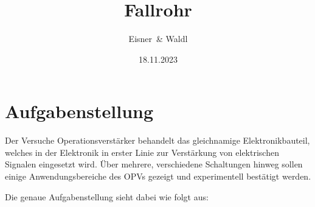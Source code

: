 \documentclass[12pt,a4paper,twoside]{article}
\begin{document}
\newcommand\laboratorynumber{2}
\title{Fallrohr}
\newcommand\supervisor{Ditlbacher, Harald}
\newcommand\groupnumber{42}

\newcommand\participantonelastname{Eisner}
\newcommand\participantonefirstname{Nico}
\newcommand\participantoneid{12214121}
\newcommand\participanttwolastname{Waldl}
\newcommand\participanttwofirstname{Philip}
\newcommand\participanttwoid{12214120}
\author{\participantonelastname \ \& \participanttwolastname}

\newcommand\degreeid{UB 033 678}
\newcommand\semester{23WS}
\date{18.11.2023}

\newcommand\coursetitle{Laborübungen 2: \\ Elektrizität, Magnetismus, Optik}

%



\tableofcontents
\newpage

\section{Aufgabenstellung} %

Der Versuche Operationsverstärker behandelt das gleichnamige Elektronikbauteil, welches in der Elektronik in erster Linie zur Verstärkung von elektrischen Signalen eingesetzt wird.
Über mehrere, verschiedene Schaltungen hinweg sollen einige Anwendungsbereiche des OPVs gezeigt und experimentell bestätigt werden.

Die genaue Aufgabenstellung sieht dabei wie folgt aus:
\end{document}
